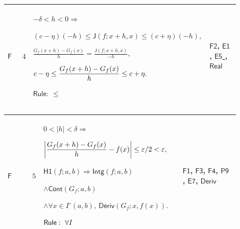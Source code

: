 \documentclass[12pt,reqno]{amsart}
\theoremstyle{blueplain}
\numberwithin{equation}{section}
\begin{document}
{\scriptsize \setlength{\parskip}{0pt}\nointerlineskip
\noindent 
\begin{tabular}{|@{}>{\centering\arraybackslash}m{0.10658\linewidth}|>{\centering\arraybackslash}m{0.03553\linewidth}|>{\centering\arraybackslash}m{0.52105\linewidth}|>{\centering\arraybackslash}m{0.23684\linewidth}|}
\hline
\hypertarget{proof:F4}{$\displaystyle \mathsf{F}$} & $\displaystyle 4$ & $%
\displaystyle -\delta<h<0\Rightarrow$\par$\displaystyle (c-\eta)(-h)\le%
\mathsf{J}(f;x+h,x)\le(c+\eta)(-h),$\par$\displaystyle \frac{G_f(x+h)-G_f(x)}%
h=\frac{\mathsf{J}(f;x+h,x)}{-h},$\par$\displaystyle c-\eta\le\frac{%
G_f(x+h)-G_f(x)}h\le c+\eta.$\par$\displaystyle \mathsf{Rule}:\ \le$ & 
\hyperlink{proof:F2}{$\displaystyle \mathsf{F2}$}, \hyperlink{proof:E1}{$%
\displaystyle \mathsf{E1}$}, \hyperlink{proof:E5}{$\displaystyle \mathsf{E5}$%
}, \hyperlink{ax:Real}{$\displaystyle \mathsf{Real}$} \\ \hline
\end{tabular}%
}

{\scriptsize \setlength{\parskip}{0pt}\nointerlineskip
\noindent 
\begin{tabular}{|@{}>{\centering\arraybackslash}m{0.10658\linewidth}|>{\centering\arraybackslash}m{0.03553\linewidth}|>{\centering\arraybackslash}m{0.52105\linewidth}|>{\centering\arraybackslash}m{0.23684\linewidth}|}
\hline
\hypertarget{proof:F5}{$\displaystyle \mathsf{F}$} & $\displaystyle 5$ & $%
\displaystyle 0<|h|<\delta\Rightarrow$\par$\displaystyle \left|\frac{%
G_f(x+h)-G_f(x)}h-f(x)\right|\le\varepsilon/2<\varepsilon,$\par$%
\displaystyle \mathsf{H1}(f;a,b)\Rightarrow\mathsf{Intg}(f;a,b)$\par$%
\displaystyle \land\mathsf{Cont}(G_f;a,b)$\par$\displaystyle \land\forall
x\in I^\circ(a,b),\ \mathsf{Deriv}(G_f;x,f(x)).$\par$\displaystyle \mathsf{%
Rule}:\ \forall I$ & \hyperlink{proof:F1}{$\displaystyle \mathsf{F1}$}, 
\hyperlink{proof:F3}{$\displaystyle \mathsf{F3}$}, \hyperlink{proof:F4}{$%
\displaystyle \mathsf{F4}$}, \hyperlink{proof:P9}{$\displaystyle \mathsf{P9}$%
}, \hyperlink{proof:E7}{$\displaystyle \mathsf{E7}$}, \hyperlink{def:Deriv}{$%
\displaystyle \mathsf{Deriv}$} \\ \hline
\end{tabular}%
}
\end{document}
